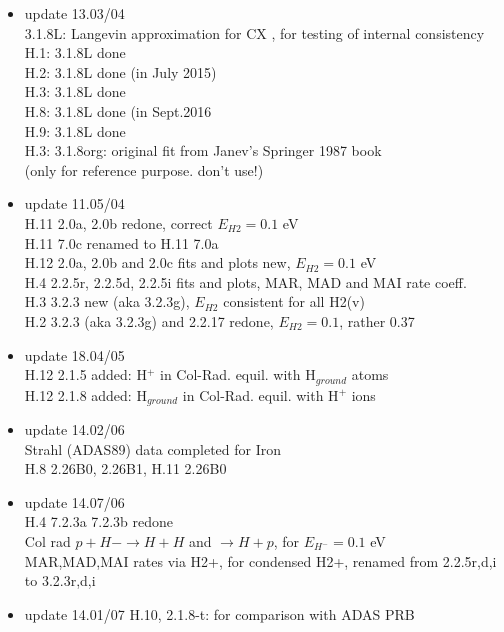 \documentclass[12pt,dvipdfmx]{article}
\begin{document}
\begin{itemize}
  H.0  Potentials for elastic collision processes included\\
  fit-flag 01 (repulsive) and fit-flag 02 (Morse) introduced.
 \item update  13.03/04 \\
  3.1.8L: Langevin approximation for CX , for testing of internal consistency\\
  H.1:  3.1.8L done  \\
  H.2:  3.1.8L done (in July 2015) \\
  H.3:  3.1.8L done   \\
  H.8:  3.1.8L done (in Sept.2016   \\
  H.9:  3.1.8L done   \\
  H.3:  3.1.8org:  original fit from Janev's Springer 1987 book\\
  (only for reference purpose. don't use!)
 \item update  11.05/04 \\
  H.11  2.0a, 2.0b  redone, correct $E_{H2}=0.1$ eV\\
  H.11 7.0c renamed to H.11 7.0a\\
  H.12 2.0a, 2.0b and 2.0c fits and plots new, $E_{H2}=0.1$ eV\\
  H.4  2.2.5r, 2.2.5d, 2.2.5i fits and plots, MAR, MAD and MAI rate coeff.\\
  H.3  3.2.3 new (aka 3.2.3g), $E_{H2}$ consistent for all H2(v) \\
  H.2  3.2.3 (aka 3.2.3g) and 2.2.17 redone, $E_{H2}= 0.1$, rather 0.37
 \item update  18.04/05 \\
  H.12 2.1.5 added: H$^+$ in Col-Rad. equil. with H$_{ground}$ atoms\\
  H.12 2.1.8 added: H$_{ground}$ in Col-Rad. equil. with H$^+$ ions\\
 \item update  14.02/06 \\
  Strahl (ADAS89) data completed for Iron \\
  H.8 2.26B0, 2.26B1, H.11 2.26B0
 \item update  14.07/06 \\
 H.4 7.2.3a 7.2.3b redone\\
  Col rad $p + H- \rightarrow H+H$ and $\rightarrow H + p$, for $E_{H^-}=0.1$ eV\\
  MAR,MAD,MAI rates via H2+, for condensed H2+, renamed from 2.2.5r,d,i to 3.2.3r,d,i
 \item update  14.01/07 H.10, 2.1.8-t: for comparison with ADAS PRB \\

\end{itemize}
\end{document}
